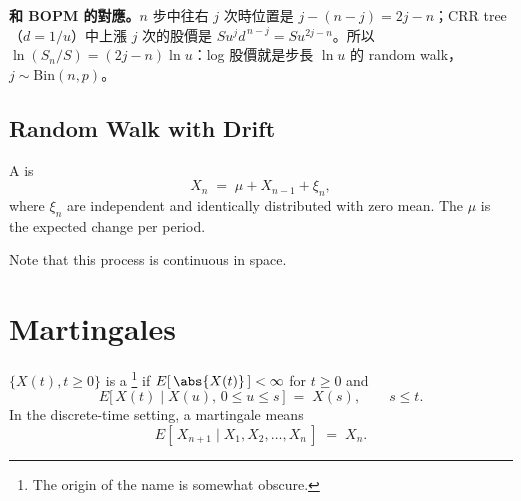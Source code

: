 \begin{remark}
	\textbf{和 BOPM 的對應。}$n$ 步中往右 $j$ 次時位置是 $j-(n-j)=2j-n$；CRR tree（$d=1/u$）中上漲 $j$ 次的股價是 $Su^{j}d^{\,n-j}=Su^{2j-n}$。所以 $\ln(S_{n}/S)=(2j-n)\ln u$：log 股價就是步長 $\ln u$ 的 random walk，$j\sim\mathrm{Bin}(n,p)$。
\end{remark}
\suppend

\subsection{Random Walk with Drift}


\begin{definition}
	A  is
	\[
		X_{n} \;=\; \mu+X_{n-1}+\xi_{n} ,
	\]
	where $\xi_{n}$ are independent and identically distributed with zero mean.
	The  $\mu$ is the expected change per period.
\end{definition}

Note that this process is continuous in space.

\suppstart
{}
\suppend

\section{Martingales}
\label{sec:martingales}


\begin{definition}
	$\{X(t),t\ge0\}$ is a \footnote{The origin of the name is somewhat obscure.} if $E[\,\abs{X(t)}\,]<\infty$ for $t\ge0$ and
	\begin{equation}
		E\bigl[\,X(t)\mid X(u),\,0\le u\le s\,\bigr] \;=\; X(s) , \qquad s\le t .
		\label{eq:martingale-ct}
	\end{equation}
	In the discrete-time setting, a martingale means
	\begin{equation}
		E[\,X_{n+1}\mid X_{1},X_{2},\dots,X_{n}\,] \;=\; X_{n} .
		\label{eq:martingale-dt}
	\end{equation}
\end{definition}

